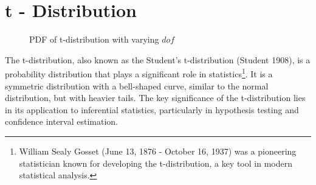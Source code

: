 \documentclass[
  a4paper,
]{scrbook}
\begin{document}
\section{t - Distribution}\label{t---distribution}

\begin{figure}[ht]


\caption{\label{fig-t-dist}PDF of t-distribution with varying \(dof\)}

\end{figure}%

The t-distribution, also known as the Student's t-distribution (Student
1908), is a probability distribution that plays a significant role in
statistics\footnote{William Sealy Gosset (June 13, 1876 - October 16,
  1937) was a pioneering statistician known for developing the
  t-distribution, a key tool in modern statistical analysis.}. It is a
symmetric distribution with a bell-shaped curve, similar to the normal
distribution, but with heavier tails. The key significance of the
t-distribution lies in its application to inferential statistics,
particularly in hypothesis testing and confidence interval estimation.
\end{document}

